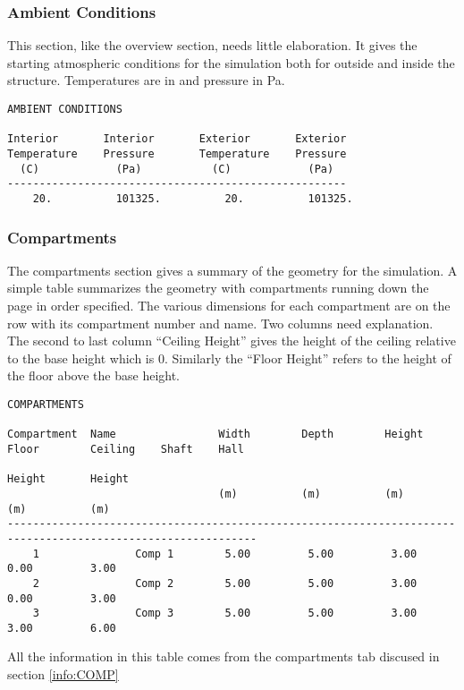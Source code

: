 \subsubsection{Ambient Conditions}

This section, like the overview section, needs little elaboration.  It gives the starting atmospheric conditions for the simulation both for outside and inside the structure. Temperatures are in \degc and pressure in Pa.
\begin{lstlisting}[basicstyle=\tiny]
AMBIENT CONDITIONS

Interior       Interior       Exterior       Exterior
Temperature    Pressure       Temperature    Pressure
  (C)            (Pa)           (C)            (Pa)
-----------------------------------------------------
    20.          101325.          20.          101325.
\end{lstlisting}

\subsubsection{Compartments}
The compartments section gives a summary of the geometry for the simulation.  A simple table summarizes the geometry with compartments running down the page in order specified.  The various dimensions for each compartment are on the row with its compartment number and name.  Two columns need explanation.  The second to last column ``Ceiling Height'' gives the height of the ceiling relative to the base height which is 0.  Similarly the ``Floor Height'' refers to the height of the floor above the base height.

\begin{lstlisting}[basicstyle=\tiny]
COMPARTMENTS

Compartment  Name                Width        Depth        Height       Floor        Ceiling    Shaft    Hall
                                                                        Height       Height
                                 (m)          (m)          (m)          (m)          (m)
-------------------------------------------------------------------------------------------------------------
    1               Comp 1        5.00         5.00         3.00         0.00         3.00
    2               Comp 2        5.00         5.00         3.00         0.00         3.00
    3               Comp 3        5.00         5.00         3.00         3.00         6.00
\end{lstlisting}
All the information in this table comes from the compartments tab discused in section  \ref{info:COMP}


